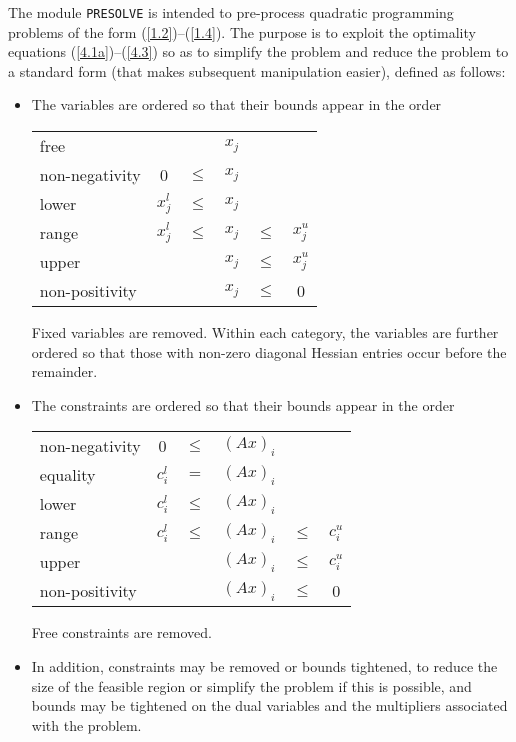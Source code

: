 \documentclass[acmtocl,acmnow]{acmtrans2m}
\newcommand{\req}[1]{(\ref{#1})}
\begin{document}
The module {\tt PRESOLVE} is intended to pre-process
quadratic programming problems of the form \req{1.2}--\req{1.4}.
The purpose is to exploit the 
optimality equations \req{4.1a}--\req{4.3} so as to simplify the problem
and reduce the problem to a standard form (that makes subsequent 
manipulation easier), defined as follows: 
\begin{itemize}
\item The variables are ordered so that their bounds appear in the order
\begin{center}
\begin{tabular}{lccccc}
free                &          &        & $x_j$ &        &          \\
non-negativity      &   0      & $\leq$ & $x_j$ &        &          \\
lower               & $x^l_j$ & $\leq$ & $x_j$ &        &          \\
range               & $x^l_j$ & $\leq$ & $x_j$ & $\leq$ & $x^u_j$ \\
upper               &          &        & $x_j$ & $\leq$ & $x^u_j$ \\
non-positivity      &          &        & $x_j$ & $\leq$ &      0   \\
\end{tabular}
\end{center}

Fixed variables are removed. Within each category, the variables 
are further ordered so that those with non-zero diagonal Hessian 
entries occur before the remainder.

\item
The constraints are ordered so that their bounds appear in the order
\begin{center}
\begin{tabular}{lccccc}
non-negativity      &     0    & $\leq$ & $( A x)_i$ &        &          \\
equality            & $c^l_i$ &   $=$  & $(A x)_i$ &        &          \\
lower               & $c^l_i$ & $\leq$ & $(A x)_i$ &        &          \\
range               & $c^l_i$ & $\leq$ & $(A x)_i$ & $\leq$ & $c^u_i$ \\
upper               &          &        & $(A x)_i$ & $\leq$ & $c^u_i$ \\
non-positivity      &          &        & $(A x)_i$ & $\leq$ &     0    \\
\end{tabular}
\end{center}
Free constraints are removed. 

\item
In addition, constraints may be removed or bounds tightened, to reduce the
size of the feasible region or simplify the problem if this is possible, and
bounds may be tightened on the dual variables and the multipliers 
associated  with the problem. 
\end{itemize}
\end{document}
